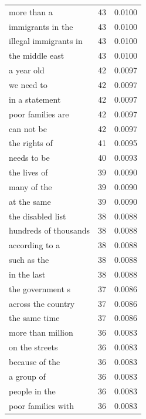 \begin{tabular}{lrl}
more than a & 43 & 0.0100 \\
immigrants in the & 43 & 0.0100 \\
illegal immigrants in & 43 & 0.0100 \\
the middle east & 43 & 0.0100 \\
a year old & 42 & 0.0097 \\
we need to & 42 & 0.0097 \\
in a statement & 42 & 0.0097 \\
poor families are & 42 & 0.0097 \\
can not be & 42 & 0.0097 \\
the rights of & 41 & 0.0095 \\
needs to be & 40 & 0.0093 \\
the lives of & 39 & 0.0090 \\
many of the & 39 & 0.0090 \\
at the same & 39 & 0.0090 \\
the disabled list & 38 & 0.0088 \\
hundreds of thousands & 38 & 0.0088 \\
according to a & 38 & 0.0088 \\
such as the & 38 & 0.0088 \\
in the last & 38 & 0.0088 \\
the government s & 37 & 0.0086 \\
across the country & 37 & 0.0086 \\
the same time & 37 & 0.0086 \\
more than million & 36 & 0.0083 \\
on the streets & 36 & 0.0083 \\
because of the & 36 & 0.0083 \\
a group of & 36 & 0.0083 \\
people in the & 36 & 0.0083 \\
poor families with & 36 & 0.0083 \\
\bottomrule
\end{tabular}
